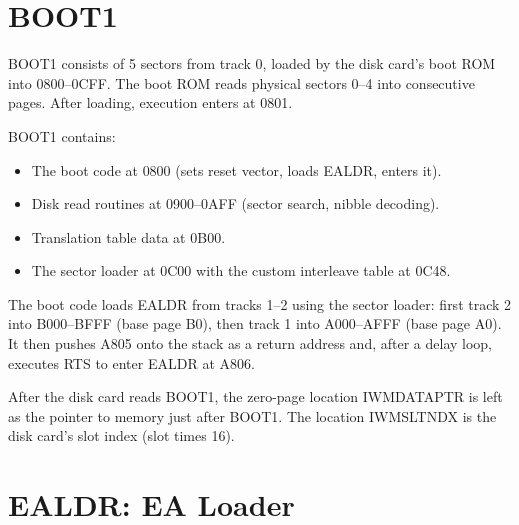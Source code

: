 \documentclass[10pt]{report}
\begin{document}
\section{BOOT1}

{\Tt{}BOOT1\nwendquote} consists of 5 sectors from track 0, loaded by the disk card's boot
ROM into {\Tt{}{\$}0800\nwendquote}--{\Tt{}{\$}0CFF\nwendquote}. The boot ROM reads physical sectors 0--4 into
consecutive pages. After loading, execution enters at {\Tt{}{\$}0801\nwendquote}.

{\Tt{}BOOT1\nwendquote} contains:
\begin{itemize}
  \item The boot code at {\Tt{}{\$}0800\nwendquote} (sets reset vector, loads {\Tt{}EALDR\nwendquote}, enters it).
  \item Disk read routines at {\Tt{}{\$}0900\nwendquote}--{\Tt{}{\$}0AFF\nwendquote} (sector search, nibble decoding).
  \item Translation table data at {\Tt{}{\$}0B00\nwendquote}.
  \item The sector loader at {\Tt{}{\$}0C00\nwendquote} with the custom interleave table at {\Tt{}{\$}0C48\nwendquote}.
\end{itemize}

The boot code loads {\Tt{}EALDR\nwendquote} from tracks 1--2 using the sector loader:
first track 2 into {\Tt{}{\$}B000\nwendquote}--{\Tt{}{\$}BFFF\nwendquote} (base page {\Tt{}{\$}B0\nwendquote}),
then track 1 into {\Tt{}{\$}A000\nwendquote}--{\Tt{}{\$}AFFF\nwendquote} (base page {\Tt{}{\$}A0\nwendquote}).
It then pushes {\Tt{}{\$}A805\nwendquote} onto the stack as a return address and, after
a delay loop, executes {\Tt{}RTS\nwendquote} to enter {\Tt{}EALDR\nwendquote} at {\Tt{}{\$}A806\nwendquote}.

After the disk card reads {\Tt{}BOOT1\nwendquote}, the zero-page location {\Tt{}IWMDATAPTR\nwendquote} is
left as the pointer to memory just after {\Tt{}BOOT1\nwendquote}. The
location {\Tt{}IWMSLTNDX\nwendquote} is the disk card's slot index (slot times 16).

\nwenddocs{}\endmoddef\nwstartdeflinemarkup\nwenddeflinemarkup
{}\nwendcode{}\nwdocspar

\section{EALDR: EA Loader}
\label{sec:ealdr}
\end{document}

